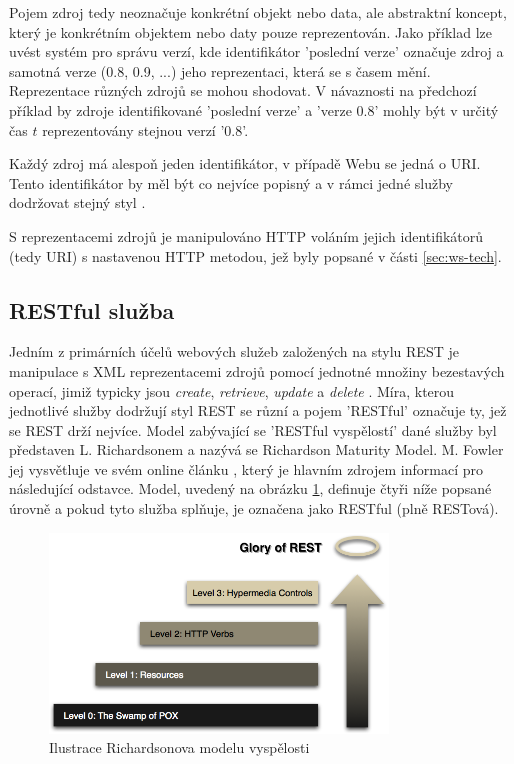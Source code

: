 \documentclass[czech,DP]{thesiskiv}
\begin{document}
Pojem zdroj tedy neoznačuje konkrétní objekt nebo data, ale abstraktní koncept, který je konkrétním objektem nebo daty pouze reprezentován. Jako příklad lze uvést systém pro správu verzí, kde identifikátor 'poslední verze' označuje zdroj a samotná verze (0.8, 0.9, ...) jeho reprezentaci, která se s časem mění. Reprezentace různých zdrojů se mohou shodovat. V návaznosti na předchozí příklad by zdroje identifikované 'poslední verze' a 'verze 0.8' mohly být v určitý čas $t$ reprezentovány stejnou verzí '0.8'. 

Každý zdroj má alespoň jeden identifikátor, v případě Webu se jedná o URI. Tento identifikátor by měl být co nejvíce popisný a v rámci jedné služby dodržovat stejný styl \cite{restfulWebServices}. 

S reprezentacemi zdrojů je manipulováno HTTP voláním jejich identifikátorů (tedy URI) s nastavenou HTTP metodou, jež byly popsané v části \ref{sec:ws-tech}.

\subsection{RESTful služba}
\label{sec:restful}

Jedním z primárních účelů webových služeb založených na stylu REST je manipulace s XML reprezentacemi zdrojů pomocí jednotné množiny bezestavých operací, jimiž typicky jsou  \textit{create}, \textit{retrieve}, \textit{update} a \textit{delete} \cite{w3cWsArch}. Míra, kterou jednotlivé služby dodržují styl REST se různí a pojem 'RESTful' označuje ty, jež se REST drží nejvíce. Model zabývající se 'RESTful vyspělostí' dané služby byl představen L. Richardsonem a nazývá se Richardson Maturity Model. M. Fowler jej vysvětluje ve svém online článku \cite{restfulMaturity}, který je hlavním zdrojem informací pro následující odstavce. Model, uvedený na obrázku \ref{fig:rmm}, definuje čtyři níže popsané úrovně a pokud tyto služba splňuje, je označena jako RESTful (plně RESTová).

\begin{figure}[h]
	\centering
	\includegraphics[width=9cm]{richardsonMaturityModel}
	\caption{Ilustrace Richardsonova modelu vyspělosti}
	\label{fig:rmm}
\end{figure}
\end{document}
